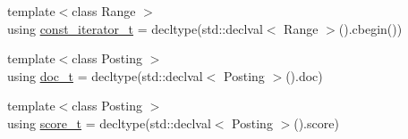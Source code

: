 \begin{DoxyCompactItemize}
\item 
{\footnotesize template$<$class Range $>$ }\\using \hyperlink{namespaceirkit_a4b1668583041117eb42c1b5a1091b804}{const\+\_\+iterator\+\_\+t} = decltype(std\+::declval$<$ Range $>$().cbegin())
\item 
{\footnotesize template$<$class Posting $>$ }\\using \hyperlink{namespaceirkit_a595d83053e112c98ab2a1b65e5dd74be}{doc\+\_\+t} = decltype(std\+::declval$<$ Posting $>$().doc)
\item 
{\footnotesize template$<$class Posting $>$ }\\using \hyperlink{namespaceirkit_a754dabe3346f950c948e7596d9d46c71}{score\+\_\+t} = decltype(std\+::declval$<$ Posting $>$().score)
\end{DoxyCompactItemize}
